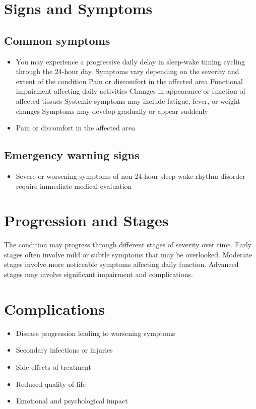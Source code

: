 \section{Signs and Symptoms}

\subsection{Common symptoms}
\begin{itemize}[noitemsep]
  \item You may experience a progressive daily delay in sleep-wake timing cycling through the 24-hour day. Symptoms vary depending on the severity and extent of the condition Pain or discomfort in the affected area Functional impairment affecting daily activities Changes in appearance or function of affected tissues Systemic symptoms may include fatigue, fever, or weight changes Symptoms may develop gradually or appear suddenly
  \item Pain or discomfort in the affected area
  \end{itemize}

\subsection{Emergency warning signs}
\begin{itemize}[noitemsep]
  \item Severe or worsening symptoms of non-24-hour sleep-wake rhythm disorder require immediate medical evaluation
\end{itemize}
\section{Progression and Stages}
The condition may progress through different stages of severity over time. Early stages often involve mild or subtle symptoms that may be overlooked. Moderate stages involve more noticeable symptoms affecting daily function. Advanced stages may involve significant impairment and complications.
\section{Complications}
\begin{itemize}[noitemsep]
  \item Disease progression leading to worsening symptoms
  \item Secondary infections or injuries
  \item Side effects of treatment
  \item Reduced quality of life
  \item Emotional and psychological impact
\end{itemize}
